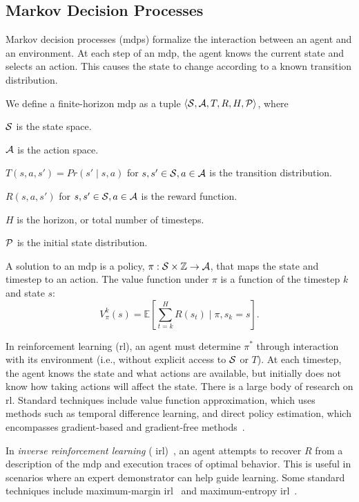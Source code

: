 \subsection{Markov Decision Processes}
Markov decision processes ({\sc mdp}s) formalize the interaction
between an agent and an environment. At each step of an {\sc mdp}, the
agent knows the current state and selects an action. This causes the
state to change according to a known transition distribution.
\begin{defn}
We define a finite-horizon {\sc mdp} as a tuple $\langle \mathcal{S}, \mathcal{A}, T,
R, H, \mathcal{P} \rangle$, where
\begin{tightlist}
\item $\mathcal{S}$ is the state space.
\item $\mathcal{A}$ is the action space.
\item $T(s, a, s') = Pr(s' \mid s, a)$ for $s, s' \in \mathcal{S}, a \in \mathcal{A}$ is the transition distribution.
\item $R(s, a, s')$ for $s, s' \in \mathcal{S}, a \in \mathcal{A}$ is the reward function.
\item $H$ is the horizon, or total number of timesteps.
\item $\mathcal{P}$ is the initial state distribution.
\end{tightlist}
\end{defn}
A solution to an {\sc mdp} is a policy, $\pi: \mathcal{S} \times \mathbb{Z} \rightarrow \mathcal{A}$,
that maps the state and timestep to an action.  The
value function under $\pi$ is a function of the timestep $k$ and state
$s$:
$$V_{\pi}^{k}(s) = \mathbb{E}\left[\sum_{t=k}^{H}R(s_{t}) \mid \pi, s_{k} = s\right].$$

In reinforcement learning ({\sc rl}), an agent must determine
$\pi^{*}$ through interaction with its environment (i.e., without
explicit access to $\mathcal{S}$ or $T$). At each timestep, the agent knows
the state and what actions are available, but initially does not know
how taking actions will affect the state. There is a large body of
research on {\sc rl}. Standard techniques include value function
approximation, which uses methods such as temporal difference
learning, and direct policy estimation, which encompasses
gradient-based and gradient-free methods~\cite{suttonbarto}.

In \emph{inverse reinforcement learning} ({\sc
  irl})~\cite{ng2000algorithms}, an agent attempts to recover $R$ from
a description of the {\sc mdp} and execution traces of optimal
behavior. This is useful in scenarios where an expert demonstrator can
help guide learning.  Some standard techniques include maximum-margin
{\sc irl}~\cite{abbeel2004apprenticeship} and maximum-entropy {\sc
  irl}~\cite{maxentirl}.
